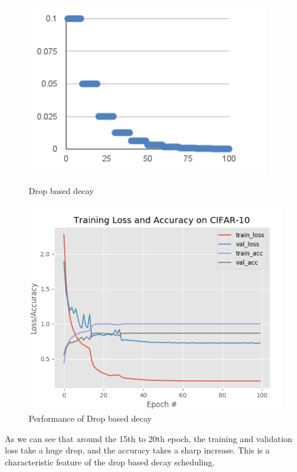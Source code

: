 \begin{figure}[!ht]
  \centering
  \begin{minipage}[b]{0.4\textwidth}
    \includegraphics[width=\textwidth]{./imgs/2019A7PS0097P-05.png}
    \caption{Drop based decay}
    \label{fig:drop_based_decay}
  \end{minipage}
  \hfill
  \begin{minipage}[b]{0.4\textwidth}
    \includegraphics[width=\textwidth]{./imgs/2019A7PS0097P-06.png}
    \caption{Performance of Drop based decay}
  \end{minipage}
\end{figure}

As we can see that around the 15th to 20th epoch, the training and validation loss take a huge drop, and the accuracy takes a sharp increase. This is a characteristic feature of the drop based decay scheduling.

